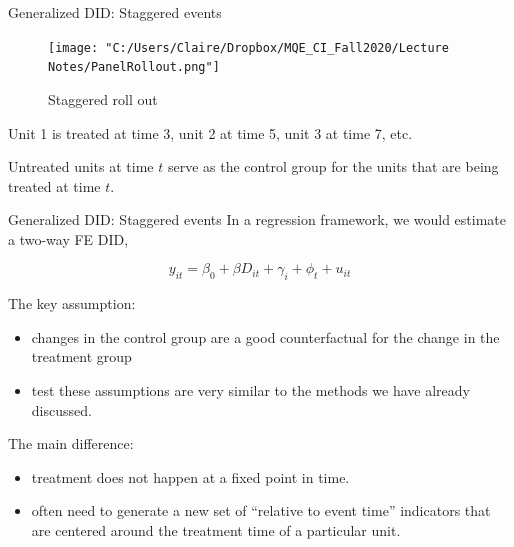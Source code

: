 \documentclass[
  ignorenonframetext,
]{beamer}
\begin{document}
\begin{frame}{Generalized DID: Staggered events}
\protect\hypertarget{generalized-did-staggered-events-1}{}
\begin{figure}
\centering
\texttt{[image: "C:/Users/Claire/Dropbox/MQE\_CI\_Fall2020/Lecture Notes/PanelRollout.png"]}
\caption{Staggered roll out}
\end{figure}

Unit 1 is treated at time 3, unit 2 at time 5, unit 3 at time 7, etc.

Untreated units at time \(t\) serve as the control group for the units
that are being treated at time \(t\).
\end{frame}

\begin{frame}{Generalized DID: Staggered events}
\protect\hypertarget{generalized-did-staggered-events-2}{}
In a regression framework, we would estimate a two-way FE DID,

\[
y_{it}=\beta_0+\beta D_{it}+\gamma_i+\phi_t+u_{it}
\]

The key assumption:

\begin{itemize}
\item
  changes in the control group are a good counterfactual for the change
  in the treatment group
\item
  test these assumptions are very similar to the methods we have already
  discussed.
\end{itemize}

The main difference:

\begin{itemize}
\item
  treatment does not happen at a fixed point in time.
\item
  often need to generate a new set of ``relative to event time''
  indicators that are centered around the treatment time of a particular
  unit.
\end{itemize}
\end{frame}
\end{document}
